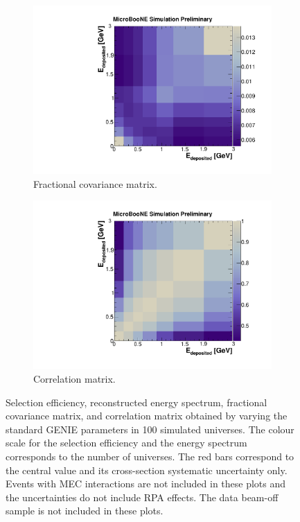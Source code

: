 \begin{figure}[htbp]
\begin{center}
\begin{subfigure}{0.49\textwidth}
      \includegraphics[width=\linewidth]{figures/frac_genie.pdf}
      \caption{Fractional covariance matrix.}\label{fig:frac_genie}
    \end{subfigure}\hfill
    \begin{subfigure}{0.49\textwidth}
      \includegraphics[width=\linewidth]{figures/corr_genie.pdf}
      \caption{Correlation matrix.}\label{fig:corr_genie}
    \end{subfigure}
    \caption{Selection efficiency, reconstructed energy spectrum, fractional covariance matrix, and correlation matrix obtained by varying the standard GENIE parameters in 100 simulated universes. The colour scale for the selection efficiency and the energy spectrum corresponds to the number of universes. The red bars correspond to the central value and its cross-section systematic uncertainty only. Events with MEC interactions are not included in these plots and the uncertainties do not include RPA effects. The data beam-off sample is not included in these plots.} \label{fig:genie_sys}
	\end{center}
\end{figure}

